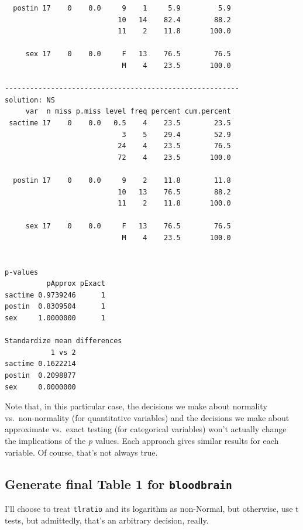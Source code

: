 \documentclass[]{book}
\theoremstyle{definition}
\theoremstyle{definition}
\theoremstyle{definition}
\theoremstyle{remark}
\begin{document}
\begin{verbatim}
  postin 17    0    0.0     9    1     5.9         5.9
                           10   14    82.4        88.2
                           11    2    11.8       100.0
                                                      
     sex 17    0    0.0     F   13    76.5        76.5
                            M    4    23.5       100.0
                                                      
-------------------------------------------------------- 
solution: NS
     var  n miss p.miss level freq percent cum.percent
 sactime 17    0    0.0   0.5    4    23.5        23.5
                            3    5    29.4        52.9
                           24    4    23.5        76.5
                           72    4    23.5       100.0
                                                      
  postin 17    0    0.0     9    2    11.8        11.8
                           10   13    76.5        88.2
                           11    2    11.8       100.0
                                                      
     sex 17    0    0.0     F   13    76.5        76.5
                            M    4    23.5       100.0
                                                      

p-values
          pApprox pExact
sactime 0.9739246      1
postin  0.8309504      1
sex     1.0000000      1

Standardize mean differences
           1 vs 2
sactime 0.1622214
postin  0.2098877
sex     0.0000000
\end{verbatim}

Note that, in this particular case, the decisions we make about
normality vs.~non-normality (for quantitative variables) and the
decisions we make about approximate vs.~exact testing (for categorical
variables) won't actually change the implications of the \emph{p}
values. Each approach gives similar results for each variable. Of
course, that's not always true.

\subsection{\texorpdfstring{Generate final Table 1 for
\texttt{bloodbrain}}{Generate final Table 1 for bloodbrain}}\label{generate-final-table-1-for-bloodbrain}

I'll choose to treat \texttt{tlratio} and its logarithm as non-Normal,
but otherwise, use t tests, but admittedly, that's an arbitrary
decision, really.
\end{document}
